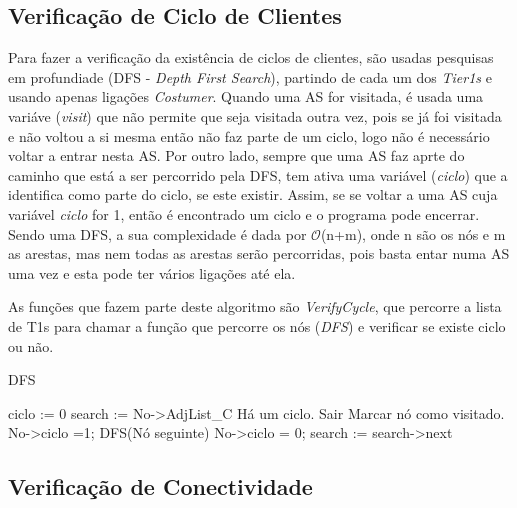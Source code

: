 \documentclass[twocolumn]{article} %
\begin{document}
		\subsection{Verificação de Ciclo de Clientes}

			Para fazer a verificação da existência de ciclos de clientes, são usadas pesquisas em profundiade (DFS - \emph{Depth First Search}), partindo de cada um dos \emph{Tier1s} e usando apenas ligações \emph{Costumer}. Quando uma AS for visitada, é usada uma variáve (\emph{visit}) que não permite que seja visitada outra vez, pois se já foi visitada e não voltou a si mesma então não faz parte de um ciclo, logo não é necessário voltar a entrar nesta AS. Por outro lado, sempre que uma AS faz aprte do caminho que está a ser percorrido pela DFS, tem ativa uma variável (\emph{ciclo}) que a identifica como parte do ciclo, se este existir. Assim, se se voltar a uma AS cuja variável \emph{ciclo} for 1, então é encontrado um ciclo e o programa pode encerrar. Sendo uma DFS, a sua complexidade é dada por $\mathcal{O}$(n+m), onde n são os nós e m as arestas, mas nem todas as arestas serão percorridas, pois basta entar numa AS uma vez e esta pode ter vários ligações até ela.

			\noindent As funções que fazem parte deste algoritmo são \emph{VerifyCycle}, que percorre a lista de T1s para chamar a função que percorre os nós (\emph{DFS}) e verificar se existe ciclo ou não. 

			\begin{algorithm}[htbp]
			\caption{DFS}
			\begin{algorithmic}[1]
				\State ciclo := 0 
				\State search := No->AdjList\_C
						\State Há um ciclo. Sair
					\Else
						\State Marcar nó como visitado.
						\State No->ciclo =1;
						\State DFS(Nó seguinte)
						\State No->ciclo = 0;
					\EndIf
					\State search := search->next

				\EndWhile
			\end{algorithmic}
			\end{algorithm}

		\subsection{Verificação de Conectividade}
\end{document}
